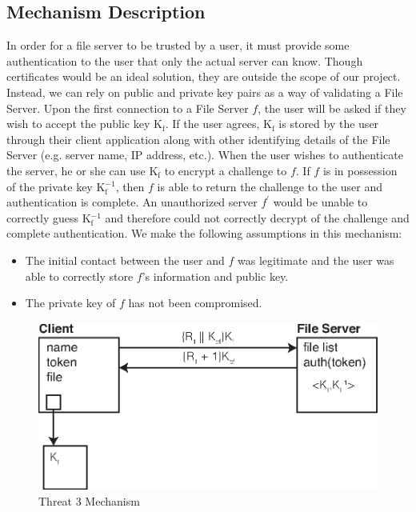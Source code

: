 \documentclass[11pt]{article}
\begin{document}
\subsection{Mechanism Description}
In order for a file server to be trusted by a user, it must provide some authentication to the user that only the actual server can know. Though certificates would be an ideal solution, they are outside the scope of our project. Instead, we can rely on public and private key pairs as a way of validating a File Server. Upon the first connection to a File Server $f$, the user will be asked if they wish to accept the public key K$_\text{f}$. If the user agrees, K$_\text{f}$ is stored by the user through their client application along with other identifying details of the File Server (e.g. server name, IP address, etc.). When the user wishes to authenticate the server, he or she can use K$_\text{f}$ to encrypt a challenge to $f$. If $f$ is in possession of the private key K$_\text{f}^{-1}$, then $f$ is able to return the challenge to the user and authentication is complete. An unauthorized server $f^\prime$ would be unable to correctly guess K$_\text{f}^{-1}$ and therefore could not correctly decrypt of the challenge and complete authentication. We make the following assumptions in this mechanism:
\begin{itemize}
\item{}The initial contact between the user and $f$ was legitimate and the user was able to correctly store $f$'s information and public key.
\item{}The private key of $f$ has not been compromised.
\end{itemize}
\begin{figure}[htbp]
\begin{center}
\includegraphics{threat3.eps}
\caption{Threat 3 Mechanism}
\label{threat3}
\end{center}
\end{figure}
\end{document}
